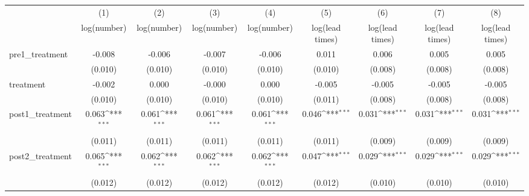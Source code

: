 {
\def\sym#1{\ifmmode^{#1}\else\(^{#1}\)\fi}
\begin{adjustbox}{max width=\textwidth}
\begin{tabular}{l*{8}{c}}
\toprule
            &\multicolumn{1}{c}{(1)}&\multicolumn{1}{c}{(2)}&\multicolumn{1}{c}{(3)}&\multicolumn{1}{c}{(4)}&\multicolumn{1}{c}{(5)}&\multicolumn{1}{c}{(6)}&\multicolumn{1}{c}{(7)}&\multicolumn{1}{c}{(8)}\\
            &\multicolumn{1}{c}{log(number)}&\multicolumn{1}{c}{log(number)}&\multicolumn{1}{c}{log(number)}&\multicolumn{1}{c}{log(number)}&\multicolumn{1}{c}{log(lead times)}&\multicolumn{1}{c}{log(lead times)}&\multicolumn{1}{c}{log(lead times)}&\multicolumn{1}{c}{log(lead times)}\\
\midrule
pre1\_treatment&      -0.008         &      -0.006         &      -0.007         &      -0.006         &       0.011         &       0.006         &       0.005         &       0.005         \\
            &     (0.010)         &     (0.010)         &     (0.010)         &     (0.010)         &     (0.010)         &     (0.008)         &     (0.008)         &     (0.008)         \\
\addlinespace
treatment   &      -0.002         &       0.000         &      -0.000         &       0.000         &      -0.005         &      -0.005         &      -0.005         &      -0.005         \\
            &     (0.010)         &     (0.010)         &     (0.010)         &     (0.010)         &     (0.011)         &     (0.008)         &     (0.008)         &     (0.008)         \\
\addlinespace
post1\_treatment&       0.063\sym{***}&       0.061\sym{***}&       0.061\sym{***}&       0.061\sym{***}&       0.046\sym{***}&       0.031\sym{***}&       0.031\sym{***}&       0.031\sym{***}\\
            &     (0.011)         &     (0.011)         &     (0.011)         &     (0.011)         &     (0.011)         &     (0.009)         &     (0.009)         &     (0.009)         \\
\addlinespace
post2\_treatment&       0.065\sym{***}&       0.062\sym{***}&       0.062\sym{***}&       0.062\sym{***}&       0.047\sym{***}&       0.029\sym{***}&       0.029\sym{***}&       0.029\sym{***}\\
            &     (0.012)         &     (0.012)         &     (0.012)         &     (0.012)         &     (0.012)         &     (0.010)         &     (0.010)         &     (0.010)         \\

\end{tabular}
\end{adjustbox}}
